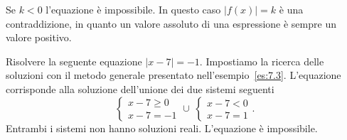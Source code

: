 Se $k<0$ l'equazione è impossibile. In questo caso $\left|f(x)\right|=k$ è una contraddizione, in quanto un valore assoluto di una espressione è sempre un valore positivo.

\begin{exrig}
\begin{esempio}
Risolvere la seguente equazione $\left|x-7\right|=-1$.
Impostiamo la ricerca delle soluzioni con il metodo generale presentato nell'esempio~\ref{es:7.3}. L'equazione corrisponde alla soluzione dell'unione dei due sistemi seguenti
\[\left\{\begin{array}{l}{x-7\ge 0}\\{x-7=-1}\end{array}\right. \cup~ \left\{\begin{array}{l}{x-7<0}\\{x-7=1}\end{array}\right..\]
Entrambi i sistemi non hanno soluzioni reali. L'equazione è impossibile.
\end{esempio}
\end{exrig}
\ovalbox{\risolvii \ref{ese:7.3}, \ref{ese:7.4}, \ref{ese:7.5}, \ref{ese:7.6}, \ref{ese:7.7}}

